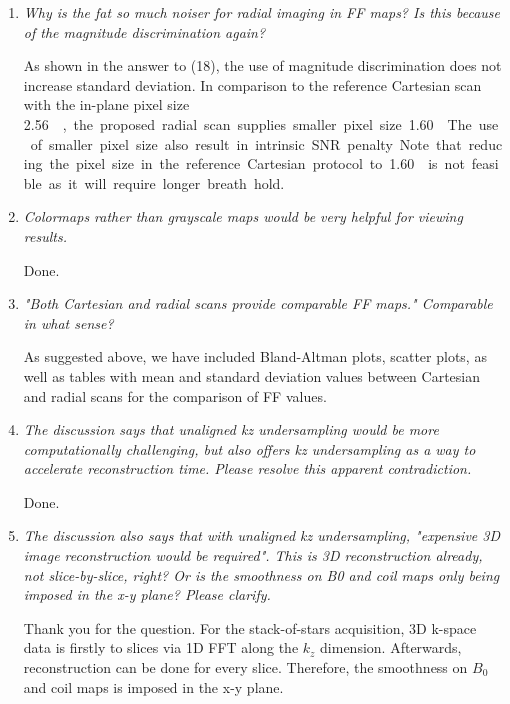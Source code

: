 \documentclass[a4paper,11pt]{report}
\begin{document}
\begin{enumerate}[resume]
	\item \textit{Why is the fat so much noiser for radial imaging in FF maps? Is this because of the magnitude discrimination again?}

\hspace{1em} As shown in the answer to (18), 
the use of magnitude discrimination does not increase standard deviation. 
In comparison to the reference Cartesian scan with the in-plane pixel size \SI{2.56}{\mm\square}, 
the proposed radial scan supplies smaller pixel size \SI{1.60}{\mm\square}. 
The use of smaller pixel size also result in intrinsic SNR penalty. 
Note that reducing the pixel size in the reference Cartesian protocol to \SI{1.60}{\mm\square} 
is not feasible as it will require longer breath hold.

	\item \textit{Colormaps rather than grayscale maps would be very helpful for viewing results.}

\hspace{1em} Done.

	\item \textit{"Both Cartesian and radial scans provide comparable FF maps." Comparable in what sense?}

\hspace{1em} As suggested above, we have included Bland-Altman plots, scatter plots, as well as tables with mean and standard deviation values between Cartesian and radial scans for the comparison of FF values.

	\item \textit{The discussion says that unaligned kz undersampling would be more computationally challenging, but also offers kz undersampling as a way to accelerate reconstruction time. Please resolve this apparent contradiction.}

\hspace{1em} Done.

	\item \textit{The discussion also says that with unaligned kz undersampling, "expensive 3D image reconstruction would be required". This is 3D reconstruction already, not slice-by-slice, right? Or is the smoothness on B0 and coil maps only being imposed in the x-y plane? Please clarify.}

\hspace{1em} Thank you for the question. For the stack-of-stars acquisition, 
3D k-space data is firstly to slices via 1D FFT along the $k_z$ dimension. 
Afterwards, reconstruction can be done for every slice. 
Therefore, the smoothness on $B_0$ and coil maps is imposed in the x-y plane.


\end{enumerate}
\end{document}
